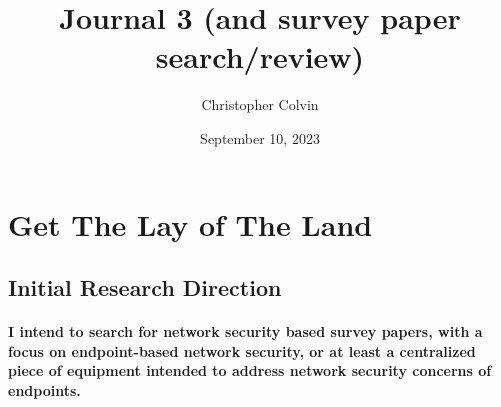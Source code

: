 \documentclass{article}
\title{Journal 3 (and survey paper search/review)}
\author{Christopher Colvin}
\date{September 10, 2023}
\begin{document}
\maketitle
\section{Get The Lay of The Land}
    \subsection{Initial Research Direction}
        \paragraph{I intend to search for network security based survey papers, with a focus on endpoint-based network security, or at least a centralized piece of equipment intended to address network security concerns of endpoints.}
\end{document}
